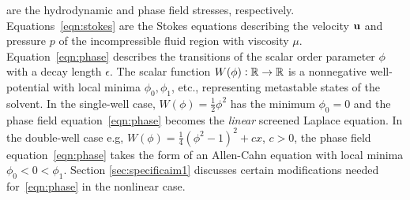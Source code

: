 are the hydrodynamic and phase field stresses, respectively.
Equations~\eqref{eqn:stokes} are the Stokes equations describing the
velocity $\mathbf{u}$ and pressure $p$ of the incompressible fluid region with
viscosity $\mu$. Equation~\eqref{eqn:phase} describes the transitions
of the scalar order parameter $\phi$ with a decay length $\epsilon$.
The scalar function $W(\phi) : \mathbb{R} \to \mathbb{R}$ is a nonnegative
well-potential with local minima $\phi_0, \phi_1$, etc., representing
metastable states of the solvent. In the single-well case, $W(\phi) =
\frac{1}{2}\phi^2$ has the minimum $\phi_0 = 0$ and the phase field
equation~\eqref{eqn:phase} becomes the \emph{linear} screened Laplace
equation. In the double-well case e.g, $W(\phi) =
\frac{1}{4}(\phi^2-1)^2+cx$, $c > 0$, the phase field
equation~\eqref{eqn:phase} takes the form of an Allen-Cahn equation with
local minima $\phi_0 < 0 < \phi_1$. Section \ref{sec:specificaim1}
discusses certain modifications needed for~\eqref{eqn:phase} in the
nonlinear case.

